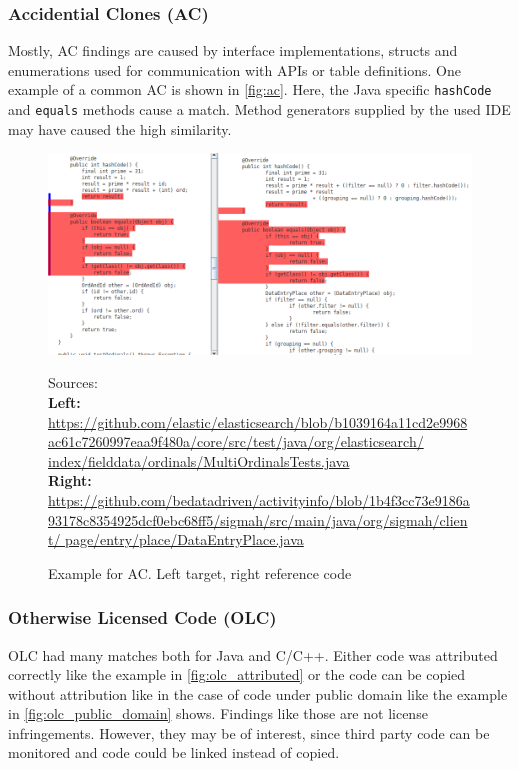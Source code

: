 \subsubsection*{Accidential Clones (AC)}
Mostly, AC findings are caused by interface implementations, structs and enumerations used for communication with APIs or table definitions.
One example of a common AC is shown in \autoref{fig:ac}.
Here, the Java specific \texttt{hashCode} and \texttt{equals} methods cause a match.
Method generators supplied by the used IDE may have caused the high similarity.
\begin{figure}[htpb]
	\centering
	\includegraphics[width=\linewidth]{figures/ac.png}
	\caption{Example for AC. Left target, right reference code}
	{
		\begin{flushleft}
			\tiny Sources:\\
			\textbf{Left:}
			\href{https://github.com/elastic/elasticsearch/blob/b1039164a11cd2e9968ac61c7260997eaa9f480a/core/src/test/java/org/elasticsearch/index/fielddata/ordinals/MultiOrdinalsTests.java}{https://github.com/elastic/elasticsearch/blob/b1039164a11cd2e9968ac61c7260997eaa9f480a/core/src/test/java/org/elasticsearch/ index/fielddata/ordinals/MultiOrdinalsTests.java}\\
			\textbf{Right:}
			\href{https://github.com/bedatadriven/activityinfo/blob/1b4f3cc73e9186a93178c8354925dcf0ebc68ff5/sigmah/src/main/java/org/sigmah/client/page/entry/place/DataEntryPlace.java}{https://github.com/bedatadriven/activityinfo/blob/1b4f3cc73e9186a93178c8354925dcf0ebc68ff5/sigmah/src/main/java/org/sigmah/client/ page/entry/place/DataEntryPlace.java}
		\end{flushleft}
	}
	\label{fig:ac}
\end{figure}

\newpage
\subsubsection*{Otherwise Licensed Code (OLC)}
OLC had many matches both for Java and C/C++.
Either code was attributed correctly like the example in \autoref{fig:olc_attributed} or the code can be copied without attribution like in the case of code under public domain like the example in \autoref{fig:olc_public_domain} shows.
Findings like those are not license infringements.
However, they may be of interest, since third party code can be monitored and code could be linked instead of copied.

